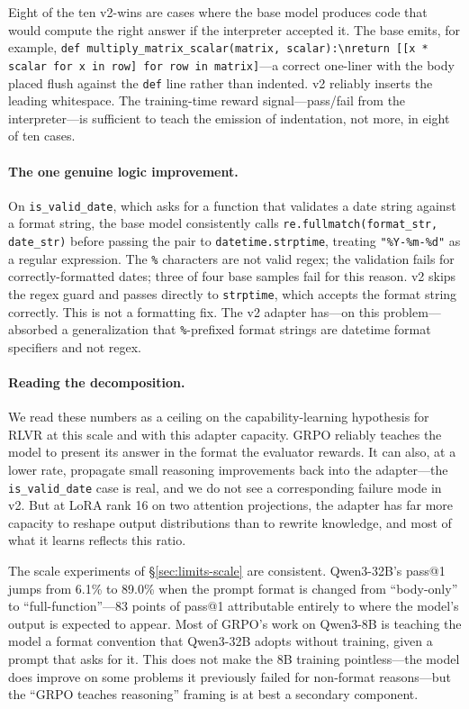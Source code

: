 \documentclass[11pt,a4paper]{article}
\begin{document}
Eight of the ten v2-wins are cases where the base model produces code that would compute the right answer if the interpreter accepted it.
The base emits, for example, \texttt{def multiply\_matrix\_scalar(matrix, scalar):\textbackslash nreturn [[x * scalar for x in row] for row in matrix]}---a correct one-liner with the body placed flush against the \texttt{def} line rather than indented.
v2 reliably inserts the leading whitespace.
The training-time reward signal---pass/fail from the interpreter---is sufficient to teach the emission of indentation, not more, in eight of ten cases.

\paragraph{The one genuine logic improvement.}
On \texttt{is\_valid\_date}, which asks for a function that validates a date string against a format string, the base model consistently calls \texttt{re.fullmatch(format\_str, date\_str)} before passing the pair to \texttt{datetime.strptime}, treating \texttt{"\%Y-\%m-\%d"} as a regular expression.
The \texttt{\%} characters are not valid regex; the validation fails for correctly-formatted dates; three of four base samples fail for this reason.
v2 skips the regex guard and passes directly to \texttt{strptime}, which accepts the format string correctly.
This is not a formatting fix.
The v2 adapter has---on this problem---absorbed a generalization that \texttt{\%}-prefixed format strings are datetime format specifiers and not regex.

\paragraph{Reading the decomposition.}
We read these numbers as a ceiling on the capability-learning hypothesis for RLVR at this scale and with this adapter capacity.
GRPO reliably teaches the model to present its answer in the format the evaluator rewards.
It can also, at a lower rate, propagate small reasoning improvements back into the adapter---the \texttt{is\_valid\_date} case is real, and we do not see a corresponding failure mode in v2.
But at LoRA rank 16 on two attention projections, the adapter has far more capacity to reshape output distributions than to rewrite knowledge, and most of what it learns reflects this ratio.

The scale experiments of \S\ref{sec:limits-scale} are consistent.
Qwen3-32B's pass@1 jumps from 6.1\% to 89.0\% when the prompt format is changed from ``body-only'' to ``full-function''---83 points of pass@1 attributable entirely to where the model's output is expected to appear.
Most of GRPO's work on Qwen3-8B is teaching the model a format convention that Qwen3-32B adopts without training, given a prompt that asks for it.
This does not make the 8B training pointless---the model does improve on some problems it previously failed for non-format reasons---but the ``GRPO teaches reasoning'' framing is at best a secondary component.
\end{document}
